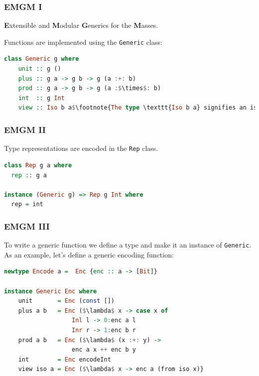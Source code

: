 \documentclass[10pt]{beamer}
\begin{document}
\begin{frame}[fragile]
\frametitle{EMGM I}
\textbf{E}xtensible and \textbf{M}odular \textbf{G}enerics for the \textbf{M}asses.
\vspace{30pt}

Functions are implemented using the \texttt{Generic} class:\\

\begin{center}
\begin{lstlisting}[language=Haskell,basicstyle=\ttfamily\scriptsize,mathescape]
class Generic g where
    unit :: g ()
    plus :: g a -> g b -> g (a :+: b)
    prod :: g a -> g b -> g (a :$\times$: b)
    int  :: g Int
    view :: Iso b a$\footnote{The type \texttt{Iso b a} signifies an isomorphism between the types \texttt{a} and \texttt{b}.}$ -> g a -> g b
\end{lstlisting}
\end{center}
\end{frame}

\begin{frame}[fragile]
\frametitle{EMGM II}
 Type representations are encoded in the \texttt{Rep} class.

\vspace{30pt}



\begin{lstlisting}[language=Haskell,basicstyle=\ttfamily\scriptsize,mathescape]
class Rep g a where
  rep :: g a
  
instance (Generic g) => Rep g Int where
  rep = int
\end{lstlisting}



\end{frame}


\begin{frame}[fragile]
\frametitle{EMGM III}
To write a generic function we define a type and make it an instance of \texttt{Generic}. As an example, let's define a generic encoding function:
\begin{lstlisting}[language=Haskell,basicstyle=\ttfamily\scriptsize,mathescape]
newtype Encode a =  Enc {enc :: a -> [Bit]}

instance Generic Enc where
    unit       = Enc (const [])
    plus a b   = Enc ($\lambda$ x -> case x of
                   Inl l -> 0:enc a l
                   Inr r -> 1:enc b r                   
    prod a b   = Enc ($\lambda$ (x :+: y) -> 
                   enc a x ++ enc b y
    int        = Enc encodeInt
    view iso a = Enc ($\lambda$ x -> enc a (from iso x)}
\end{lstlisting}

\end{frame}
\end{document}

